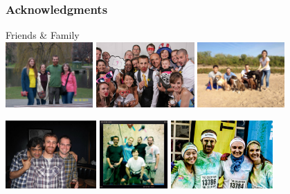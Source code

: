 \begin{frame}[t]
    \frametitle{Acknowledgments}
    \begin{center}
    Friends \& Family \\
    \smallskip
    \includegraphics[height=2.5cm]{../images/photos/fam.jpg}\hspace{0.2mm}
    \includegraphics[height=2.5cm]{../images/photos/wed.jpg}\hspace{0.2mm}
    \includegraphics[height=2.5cm]{../images/photos/friends4.jpg}

    \smallskip
    \includegraphics[height=2.6cm]{../images/photos/friends1.jpg}\hspace{0.2mm}
    \includegraphics[height=2.6cm]{../images/photos/friends2.jpg}\hspace{0.2mm}
    \includegraphics[height=2.6cm]{../images/photos/friends3.jpg}
    \end{center}
\end{frame}

